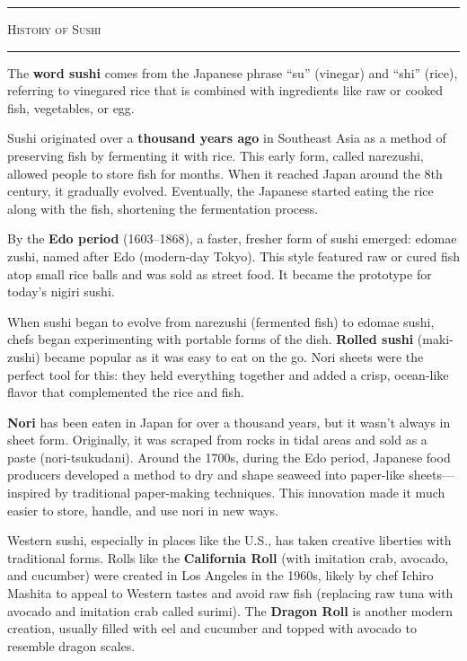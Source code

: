 \documentclass[landscape, a4paper]{article}
\newcommand\alert[1]{\textcolor{PrimaryColor}{\textbf{#1}}}
\begin{document}
\hfill\color{white}%
\vrule width 0.01cm
\hfill\color{black}%
\begin{minipage}[t]{0.31\textwidth}
	\vspace{0.5cm}
	\setlength{\parskip}{0.25cm}

	\textcolor{PrimaryColor}{
		\rule{\linewidth}{0.5mm}
		\vspace{-0.1cm}
		\begin{center}
			\large
			\textsc{History of Sushi}
		\end{center}
		\rule{\linewidth}{0.5mm}
	}

	The \alert{word sushi} comes from the Japanese phrase \enquote{su} (vinegar) and \enquote{shi} (rice), referring to vinegared rice that is combined with ingredients like raw or cooked fish, vegetables, or egg.

	Sushi originated over a \alert{thousand years ago} in Southeast Asia as a method of preserving fish by fermenting it with rice. This early form, called narezushi, allowed people to store fish for months. When it reached Japan around the 8th century, it gradually evolved. Eventually, the Japanese started eating the rice along with the fish, shortening the fermentation process.

	By the \alert{Edo period} (1603–1868), a faster, fresher form of sushi emerged: edomae zushi, named after Edo (modern-day Tokyo). This style featured raw or cured fish atop small rice balls and was sold as street food. It became the prototype for today’s nigiri sushi.

	When sushi began to evolve from narezushi (fermented fish) to edomae sushi, chefs began experimenting with portable forms of the dish. \alert{Rolled sushi} (maki-zushi) became popular as it was easy to eat on the go. Nori sheets were the perfect tool for this: they held everything together and added a crisp, ocean-like flavor that complemented the rice and fish.

	\alert{Nori} has been eaten in Japan for over a thousand years, but it wasn't always in sheet form. Originally, it was scraped from rocks in tidal areas and sold as a paste (nori-tsukudani). Around the 1700s, during the Edo period, Japanese food producers developed a method to dry and shape seaweed into paper-like sheets—inspired by traditional paper-making techniques. This innovation made it much easier to store, handle, and use nori in new ways.

	Western sushi, especially in places like the U.S., has taken creative liberties with traditional forms. Rolls like the \alert{California Roll} (with imitation crab, avocado, and cucumber) were created in Los Angeles in the 1960s, likely by chef Ichiro Mashita to appeal to Western tastes and avoid raw fish (replacing raw tuna with avocado and imitation crab called surimi). The \alert{Dragon Roll} is another modern creation, usually filled with eel and cucumber and topped with avocado to resemble dragon scales.


\end{minipage}
\end{document}
